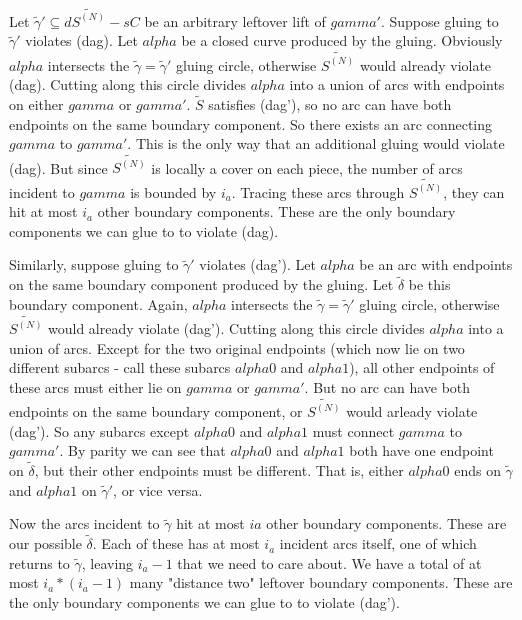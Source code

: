 \documentclass[12pt]{amsart}
\theoremstyle{definition}
\theoremstyle{remark}
\newcommand{\cin}{\subseteq}
\begin{document}
Let $\widetilde{\gamma}' \cin d\widetilde{S^{(N)}} - sC$ be an arbitrary leftover lift of
$gamma'$.  Suppose gluing to $\widetilde{\gamma}'$ violates (dag). Let $alpha$ be
a closed curve produced by the gluing.  Obviously $alpha$ intersects the
$\widetilde{\gamma} = \widetilde{\gamma}'$ gluing circle, otherwise $\widetilde{S^{(N)}}$ would already
violate (dag).  Cutting along this circle divides $alpha$ into a union of arcs
with endpoints on either $gamma$ or $gamma'$.  $\widetilde{S}$ satisfies (dag'), so no
arc can have both endpoints on the same boundary component. So there exists an
arc connecting $gamma$ to $gamma'$. This is the only way that an additional
gluing would violate (dag). But since $\widetilde{S^{(N)}}$ is locally a cover on each
piece, the number of arcs incident to $gamma$ is bounded by $i_a$.  Tracing
these arcs through $\widetilde{S^{(N)}}$, they can hit at most $i_a$ other boundary
components.  These are the only boundary components we can glue to to violate
(dag).

Similarly, suppose gluing to $\widetilde{\gamma}'$ violates (dag'). Let $alpha$ be an
arc with endpoints on the same boundary component produced by the gluing. Let
$\widetilde{\delta}$ be this boundary component. Again, $alpha$ intersects the
$\widetilde{\gamma} = \widetilde{\gamma}'$ gluing circle, otherwise $\widetilde{S^{(N)}}$ would already
violate (dag').  Cutting along this circle divides $alpha$ into a union of
arcs.  Except for the two original endpoints (which now lie on two different
subarcs - call these subarcs $alpha0$ and $alpha1$), all other endpoints of
these arcs must either lie on $gamma$ or $gamma'$.  But no arc can have both
endpoints on the same boundary component, or $\widetilde{S^{(N)}}$ would arleady violate
(dag'). So any subarcs except $alpha0$ and $alpha1$ must connect $gamma$ to
$gamma'$.  By parity we can see that $alpha0$ and $alpha1$ both have one
endpoint on $\widetilde{\delta}$, but their other endpoints must be different. That is,
either $alpha0$ ends on $\widetilde{\gamma}$ and $alpha1$ on $\widetilde{\gamma}'$, or vice
versa.

Now the arcs incident to $\widetilde{\gamma}$ hit at most $ia$ other boundary
components. These are our possible $\widetilde{\delta}$. Each of these has at
most $i_a$ incident arcs itself, one of which returns to $\widetilde{\gamma}$,
leaving $i_a-1$ that we need to care about. We have a total of at most
$i_a*(i_a-1)$ many "distance two" leftover boundary components. These are the
only boundary components we can glue to to violate (dag').
\end{document}
